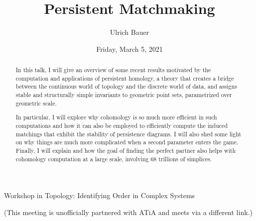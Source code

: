 \documentclass{UAmathtalk}
\author{Ulrich Bauer}
\title{Persistent Matchmaking}
\date{Friday, March 5, 2021}
\begin{document}
\maketitle

\begin{center}
\Large{Workshop in Topology: Identifying Order in Complex Systems}

\normalsize{(This meeting is unofficially partnered with ATiA and meets via a different link.)}
\end{center}

\begin{abstract}
In this talk, I will give an overview of some recent results motivated by the computation and applications of persistent homology, a theory that creates a bridge between the continuous world of topology and the discrete world of data, and assigns stable and structurally simple invariants to geometric point sets, parametrized over geometric scale.

In particular, I will explore why cohomology is so much more efficient in such computations and how it can also be employed to efficiently compute the induced matchings that exhibit the stability of persistence diagrams. I will also shed some light on why things are much more complicated when a second parameter enters the game. Finally, I will explain and how the goal of finding the perfect partner also helps with cohomology computation at a large scale, involving 68 trillions of simplices.

\end{abstract}
\end{document}
